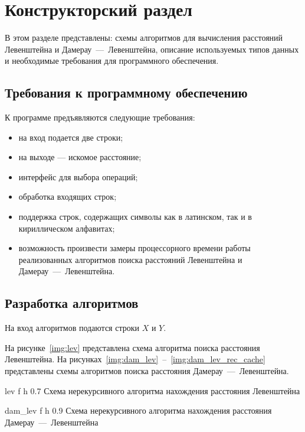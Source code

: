 \chapter{Конструкторский раздел}

В этом разделе представлены:  схемы алгоритмов  для вычисления расстояний Левенштейна и Дамерау~---~Левенштейна, описание используемых типов данных и необходимые требования для программного обеспечения.

\section{Требования к программному обеспечению}\label{section:requirements}

К программе предъявляются следующие требования:
\begin{itemize}
	\item на вход подается две строки;
	\item на выходе --- искомое расстояние;
	\item интерфейс для выбора операций;
	\item обработка входящих строк;
	\item поддержка строк, содержащих символы как в латинском, так и в кириллическом алфавитах;
	\item возможность произвести замеры процессорного времени работы реализованных алгоритмов поиска расстояний Левенштейна и Дамерау~---~Левенштейна.
\end{itemize}

\section{Разработка алгоритмов}

На вход алгоритмов подаются строки $X$ и $Y$.

На рисунке~\ref{img:lev} представлена схема алгоритма поиска расстояния Левенштейна.
На рисунках~\ref{img:dam_lev}~--~\ref{img:dam_lev_rec_cache} представлены схемы алгоритмов поиска расстояния Дамерау~---~Левенштейна.

	{lev} %
	{f} %
	{h} %
	{0.7\textwidth} %
	{Схема нерекурсивного алгоритма нахождения расстояния Левенштейна} %
	
\clearpage

	{dam_lev} %
	{f} %
	{h} %
	{0.9\textwidth} %
	{Схема нерекурсивного алгоритма нахождения расстояния Дамерау~---~Левенштейна} %
\clearpage

